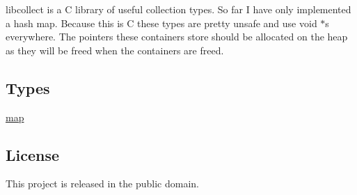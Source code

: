 {\ttfamily libcollect} is a C library of useful collection types. So far I have only implemented a hash map. Because this is C these types are pretty unsafe and use {\ttfamily void $\ast$}s everywhere. The pointers these containers store should be allocated on the heap as they will be freed when the containers are freed.

\subsection*{Types}


\begin{DoxyItemize}
\item \hyperlink{structmap}{map}
\end{DoxyItemize}

\subsection*{License}

This project is released in the public domain. 